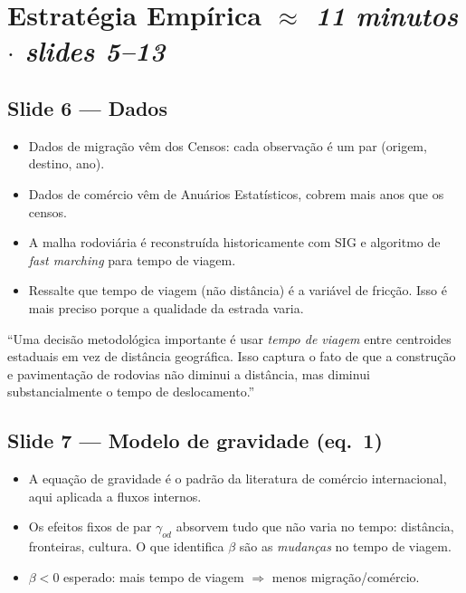 \documentclass[12pt, a4paper]{article}
\begin{document}
\section{Estratégia Empírica \hfill \normalfont\small\textit{$\approx$ 11 minutos $\cdot$ slides 5--13}}

\subsection*{Slide 6 --- Dados}

\begin{itemize}
    \item Dados de migração vêm dos Censos: cada observação é um par (origem, destino, ano).
    \item Dados de comércio vêm de Anuários Estatísticos, cobrem mais anos que os censos.
    \item A malha rodoviária é reconstruída historicamente com SIG e algoritmo de \textit{fast marching} para tempo de viagem.
    \item Ressalte que tempo de viagem (não distância) é a variável de fricção. Isso é mais preciso porque a qualidade da estrada varia.
\end{itemize}

\begin{mdframed}[style=sintese]
``Uma decisão metodológica importante é usar \textit{tempo de viagem} entre centroides estaduais
em vez de distância geográfica. Isso captura o fato de que a construção e pavimentação de rodovias
não diminui a distância, mas diminui substancialmente o tempo de deslocamento.''
\end{mdframed}

\subsection*{Slide 7 --- Modelo de gravidade (eq.\ 1)}

\begin{itemize}
    \item A equação de gravidade é o padrão da literatura de comércio internacional, aqui aplicada a fluxos internos.
    \item Os efeitos fixos de par $\gamma_{od}$ absorvem tudo que não varia no tempo: distância, fronteiras, cultura. O que identifica $\beta$ são as \textit{mudanças} no tempo de viagem.
    \item $\beta < 0$ esperado: mais tempo de viagem $\Rightarrow$ menos migração/comércio.
\end{itemize}
\end{document}
